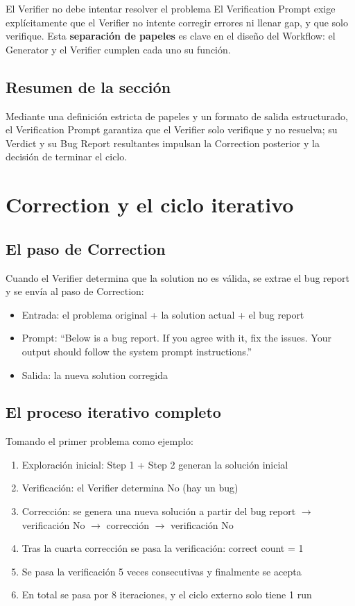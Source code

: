 \documentclass[a4paper]{article}
\begin{document}
\begin{warningbox}{El Verifier no debe intentar resolver el problema}
El Verification Prompt exige explícitamente que el Verifier no intente corregir errores ni llenar gap, y que solo verifique. Esta \textbf{separación de papeles} es clave en el diseño del Workflow: el Generator y el Verifier cumplen cada uno su función.
\end{warningbox}

\subsection{Resumen de la sección}

Mediante una definición estricta de papeles y un formato de salida estructurado, el Verification Prompt garantiza que el Verifier solo verifique y no resuelva; su Verdict y su Bug Report resultantes impulsan la Correction posterior y la decisión de terminar el ciclo.

\section{Correction y el ciclo iterativo}

\subsection{El paso de Correction}

Cuando el Verifier determina que la solution no es válida, se extrae el bug report y se envía al paso de Correction:
\begin{itemize}
    \item Entrada: el problema original + la solution actual + el bug report
    \item Prompt: ``Below is a bug report. If you agree with it, fix the issues. Your output should follow the system prompt instructions.''
    \item Salida: la nueva solution corregida
\end{itemize}

\subsection{El proceso iterativo completo}

Tomando el primer problema como ejemplo:
\begin{enumerate}
    \item Exploración inicial: Step 1 + Step 2 generan la solución inicial
    \item Verificación: el Verifier determina No (hay un bug)
    \item Corrección: se genera una nueva solución a partir del bug report $\rightarrow$ verificación No $\rightarrow$ corrección $\rightarrow$ verificación No
    \item Tras la cuarta corrección se pasa la verificación: correct count = 1
    \item Se pasa la verificación 5 veces consecutivas y finalmente se acepta
    \item En total se pasa por 8 iteraciones, y el ciclo externo solo tiene 1 run
\end{enumerate}
\end{document}
